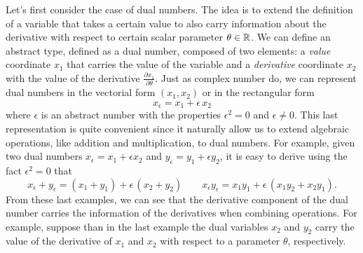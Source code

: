 Let's first consider the case of dual numbers.
The idea is to extend the definition of a variable that takes a certain value to also carry information about the derivative with respect to certain scalar parameter $\theta \in \operatorname{\mathbb{R}}$. 
We can define an abstract type, defined as a dual number, composed of two elements: a \textit{value} coordinate $x_1$ that carries the value of the variable and a \textit{derivative} coordinate $x_2$ with the value of the derivative $\frac{\partial x_1}{\partial \theta}$. 
Just as complex number do, we can represent dual numbers in the vectorial form $(x_1, x_2)$ or in the rectangular form 
\begin{equation}
 x_\epsilon = x_1 + \epsilon \, x_2
\end{equation}
where $\epsilon$ is an abstract number with the properties $\epsilon^2 = 0$ and $\epsilon \neq 0$.
This last representation is quite convenient since it naturally allow us to extend algebraic operations, like addition and multiplication, to dual numbers. 
For example, given two dual numbers $x_\epsilon = x_1 + \epsilon x_2$ and $y_\epsilon = y_1 + \epsilon y_2$, it is easy to derive using the fact $\epsilon^2=0$ that
\begin{equation}
 x_\epsilon + y_\epsilon = (x_1 + y_1) + \epsilon \, (x_2 + y_2)
 \qquad
 x_\epsilon y_\epsilon = x_1 y_1 + \epsilon \, (x_1 y_2 + x_2 y_1) .
\end{equation}
From these last examples, we can see that the derivative component of the dual number carries the information of the derivatives when combining operations.
For example, suppose than in the last example the dual variables $x_2$ and $y_2$ carry the value of the derivative of $x_1$ and $x_2$ with respect to a parameter $\theta$, respectively. 

